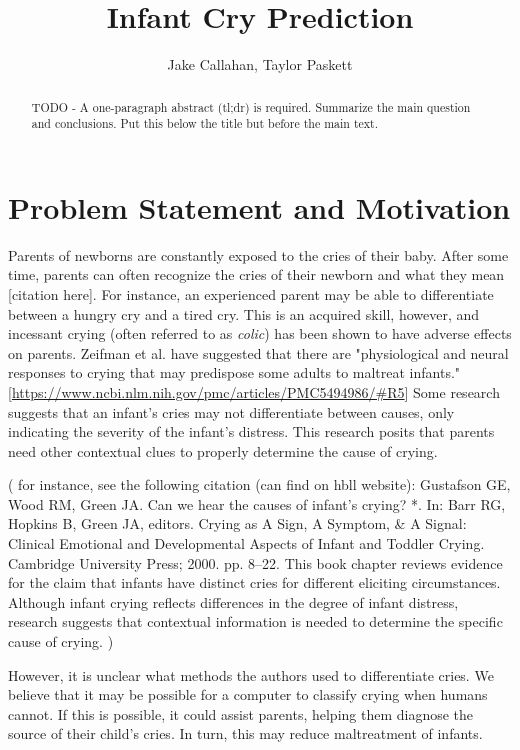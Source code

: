 \documentclass[10pt,letterpaper]{article}
\title{Infant Cry Prediction}
\author{Jake Callahan, Taylor Paskett}
\begin{document}
\maketitle

\begin{abstract}
   TODO - A one-paragraph abstract (tl;dr) is required. Summarize the main question and conclusions. Put this below the title but before the main text.
\end{abstract}

\section{Problem Statement and Motivation}
Parents of newborns are constantly exposed to the cries of their baby.
After some time, parents can often recognize the cries of their newborn and what they mean [citation here].
For instance, an experienced parent may be able to differentiate between a hungry cry and a tired cry.
This is an acquired skill, however, and incessant crying (often referred to as \textit{colic}) has been shown to have adverse effects on parents.
Zeifman et al. have suggested that there are "physiological and neural responses to crying that may predispose some adults to maltreat infants." [\url{https://www.ncbi.nlm.nih.gov/pmc/articles/PMC5494986/#R5}]
Some research suggests that an infant's cries may not differentiate between causes, only indicating the severity of the infant's distress.
This research posits that parents need other contextual clues to properly determine the cause of crying.

( for instance, see the following citation (can find on hbll website):
Gustafson GE, Wood RM, Green JA. Can we hear the causes of infant’s crying? *. In: Barr RG, Hopkins B, Green JA, editors. Crying as A Sign, A Symptom, \& A Signal: Clinical Emotional and Developmental Aspects of Infant and Toddler Crying. Cambridge University Press; 2000. pp. 8–22. This book chapter reviews evidence for the claim that infants have distinct cries for different eliciting circumstances. Although infant crying reflects differences in the degree of infant distress, research suggests that contextual information is needed to determine the specific cause of crying. )

However, it is unclear what methods the authors used to differentiate cries.
We believe that it may be possible for a computer to classify crying when humans cannot.
If this is possible, it could assist parents, helping them diagnose the source of their child's cries.
In turn, this may reduce maltreatment of infants.
\end{document}
